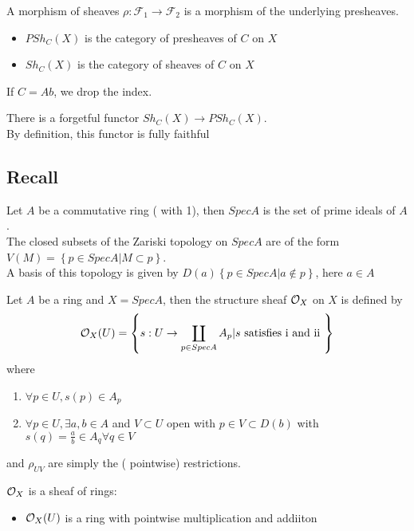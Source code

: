 \documentclass[../main.tex]{subfiles}
\begin{document}
\begin{defn}
	A morphism of sheaves $\rho: \mathcal{F}_1 \to \mathcal{F}_2$ is a morphism of the underlying presheaves.
\end{defn}
\begin{rmq}
\begin{itemize}
\item $PSh_C( X) $ is the category of presheaves of $C$ on $X$ 
\item $Sh_C( X) $ is the category of sheaves of $C$ on $X$ 
\end{itemize}
If $C= Ab$, we drop the index.
\end{rmq}
\begin{rmq}
There is a forgetful functor $Sh_C( X) \to PSh_C( X) $.\\
By definition, this functor is fully faithful
\end{rmq}
\subsection*{Recall}
Let $A$ be a commutative ring ( with 1), then $Spec A$ is the set of prime ideals of $A$.\\
The closed subsets of the Zariski topology on $Spec A$ are of the form $V( M) = \left\{ p \in Spec A | M \subset p \right\} $.\\
A basis of this topology is given by $D( a)  \left\{ p \in Spec A | a \notin p  \right\} $, here $a\in A$ 
\begin{defn}
	Let $A$ be a ring and $X= Spec A$, then the structure sheaf $ \mathcal{O}_X$ on $X$ is defined by
	\[ 
	\mathcal{O}_X( U) = \left\{ s: U \to \coprod_{p \in Spec A}  A_p | s \text{ satisfies i and ii }  \right\} 
	\]
	where
	\begin{enumerate}
		\item $\forall p\in U, s( p) \in A_p$
		\item $\forall p \in U, \exists a,b \in A$ and $V \subset U$ open with $p \in V \subset D( b) $ with $s( q) = \frac{a}{b}\in A_q \forall q\in V$ 
	\end{enumerate}
	and $\rho_{UV} $ are simply the ( pointwise) restrictions.
\end{defn}
\begin{rmq}
$\mathcal{O}_X$ is a sheaf of rings:
\begin{itemize}
\item $\mathcal{O}_X( U) $ is a ring with pointwise multiplication and addiiton
\end{itemize}

\end{rmq}












		
\end{document}
